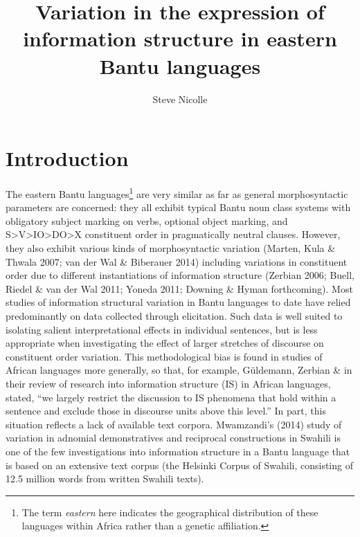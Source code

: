 \documentclass[output=paper]{langsci/langscibook}
\title{Variation in the expression of information structure in eastern {Bantu} languages}
\author{%
Steve Nicolle\affiliation{Canada Institute of Linguistics / SIL International} 
}
\begin{document}
\section{Introduction}

The eastern Bantu languages\footnote{The term \textit{e}\textit{astern} here indicates the geographical distribution of these languages within Africa rather than a genetic affiliation.} are very similar as far as general morphosyntactic parameters are concerned: they all exhibit typical Bantu noun class systems with obligatory subject marking on verbs, optional object marking, and S{\textgreater}V{\textgreater}IO{\textgreater}DO{\textgreater}X constituent order in pragmatically neutral clauses. However, they also exhibit various kinds of morphosyntactic variation (Marten, Kula \& Thwala 2007; van der Wal \& Biberauer 2014) including variations in constituent order due to different instantiations of information structure (Zerbian 2006; Buell, Riedel \& van der Wal 2011; Yoneda 2011; Downing \& Hyman forthcoming). Most studies of information structural variation in Bantu languages to date have relied predominantly on data collected through elicitation. Such data is well suited to isolating salient interpretational effects in individual sentences, but is less appropriate when investigating the effect of larger stretches of discourse on constituent order variation. This methodological bias is found in studies of African languages more generally, so that, for example, Güldemann, Zerbian \& \citet[157]{Zimmermann2015} in their review of research into information structure (IS) in African languages, stated, “we largely restrict the discussion to IS phenomena that hold within a sentence and exclude those in discourse units above this level.” In part, this situation reflects a lack of available text corpora. Mwamzandi’s (2014) study of variation in adnomial demonstratives and reciprocal constructions in Swahili is one of the few investigations into information structure in a Bantu language that is based on an extensive text corpus (the Helsinki Corpus of Swahili, consisting of 12.5 million words from written Swahili texts).
\end{document}

